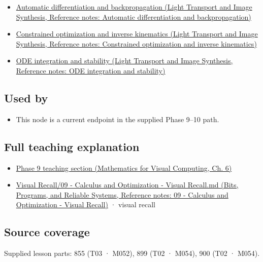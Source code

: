\begin{itemize}
\tightlist
\item
  \href{../04-Light-Transport-and-Image-Synthesis/main.pdf\#nameddest=appendix-40df0855b4a7}{Automatic differentiation and backpropagation (Light Transport and Image Synthesis, Reference notes: Automatic differentiation and backpropagation)}
\item
  \href{../04-Light-Transport-and-Image-Synthesis/main.pdf\#nameddest=appendix-29f4bea4c2bb}{Constrained optimization and inverse kinematics (Light Transport and Image Synthesis, Reference notes: Constrained optimization and inverse kinematics)}
\item
  \href{../04-Light-Transport-and-Image-Synthesis/main.pdf\#nameddest=appendix-18eacf61a04b}{ODE integration and stability (Light Transport and Image Synthesis, Reference notes: ODE integration and stability)}
\end{itemize}

\subsection{Used by}\label{appendix-8836553d56fc-used-by}

\hypertarget{appendix-8836553d56fc-used-by}{}

\begin{itemize}
\tightlist
\item
  This node is a current endpoint in the supplied Phase 9--10 path.
\end{itemize}

\subsection{Full teaching explanation}\label{appendix-8836553d56fc-full-teaching-explanation}

\hypertarget{appendix-8836553d56fc-full-teaching-explanation}{}

\begin{itemize}
\tightlist
\item
  \href{../02-Mathematics-for-Visual-Computing/main.pdf\#nameddest=02-foundations-ii-ch022-numerical-differentiation-and-automatic-differentiation}{Phase 9 teaching section (Mathematics for Visual Computing, Ch. 6)}
\item
  \href{../01-Bits-Programs-and-Reliable-Systems/main.pdf\#nameddest=appendix-adf48f5dc5c1}{Visual Recall/09 - Calculus and Optimization - Visual Recall.md (Bits, Programs, and Reliable Systems, Reference notes: 09 - Calculus and Optimization - Visual Recall)} · visual recall
\end{itemize}

\subsection{Source coverage}\label{appendix-8836553d56fc-source-coverage}

\hypertarget{appendix-8836553d56fc-source-coverage}{}

Supplied lesson parts: 855 (T03 · M052), 899 (T02 · M054), 900 (T02 · M054).
